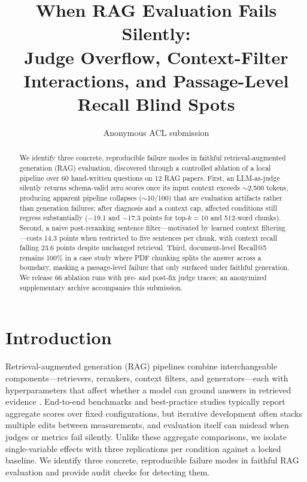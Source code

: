 \documentclass[11pt]{article}
\title{When RAG Evaluation Fails Silently:\\
Judge Overflow, Context-Filter Interactions, and Passage-Level Recall Blind Spots}
\author{Anonymous ACL submission}
\begin{document}
\maketitle

\begin{abstract}
We identify three concrete, reproducible failure modes in faithful retrieval-augmented generation (RAG) evaluation, discovered through a controlled ablation of a local pipeline over 60 hand-written questions on 12 RAG papers.
First, an LLM-as-judge silently returns schema-valid zero scores once its input context exceeds ${\sim}$2,500 tokens, producing apparent pipeline collapses (${\sim}$10/100) that are evaluation artifacts rather than generation failures; after diagnosis and a context cap, affected conditions still regress substantially ($-$19.1 and $-$17.3 points for top-$k{=}10$ and 512-word chunks).
Second, a naive post-reranking sentence filter---motivated by learned context filtering \citep{wang2023filco}---costs 14.3 points when restricted to five sentences per chunk, with context recall falling 23.6 points despite unchanged retrieval.
Third, document-level Recall@5 remains 100\% in a case study where PDF chunking splits the answer across a boundary, masking a passage-level failure that only surfaced under faithful generation.
We release 66 ablation runs with pre- and post-fix judge traces; an anonymized supplementary archive accompanies this submission.
\end{abstract}

\section{Introduction}

Retrieval-augmented generation (RAG) pipelines combine interchangeable components---retrievers, rerankers, context filters, and generators---each with hyperparameters that affect whether a model can ground answers in retrieved evidence \citep{lewis2020rag,gao2023survey}.
End-to-end benchmarks \citep{chen2024rgb,es2024ragas} and best-practice studies \citep{wang2024bestpractices,li2025bestpractices} typically report aggregate scores over fixed configurations, but iterative development often stacks multiple edits between measurements, and evaluation itself can mislead when judges or metrics fail silently.
Unlike these aggregate comparisons, we isolate single-variable effects with three replications per condition against a locked baseline.
We identify three concrete, reproducible failure modes in faithful RAG evaluation and provide audit checks for detecting them.
\end{document}
